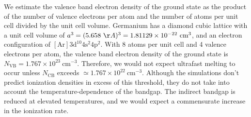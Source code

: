 We estimate the valence band electron density of the ground state as the product of the number of valence electrons per atom and the number of atoms per unit cell divided by the unit cell volume. Germanium has a diamond cubic lattice with a unit cell volume of ${a^3 = (5.658 \ \AA)^3 = 1.81129 \times 10^{-22} \ \textrm{cm}^3}$, and an electron configuration of ${[\textrm{Ar}] 3\textrm{d}^{10 }4\textrm{s}^2 4\textrm{p}^2}$. With 8 atoms per unit cell and 4 valence electrons per atom, the valence band electron density of the ground state is $N_{\textrm{VB}} = 1.767 \times 10^{23} \ \textrm{cm}^{-3}$. Therefore, we would not expect ultrafast melting to occur unless $N_{\textrm{CB}}$ exceeds $\simeq 1.767 \times 10^{22} \ \textrm{cm}^{-3}$. Although the simulations don't predict ionization densities in excess of this threshold, they do not take into account the temperature-dependence of the bandgap. The indirect bandgap is reduced at elevated temperatures, and we would expect a commensurate increase in the ionization rate.


